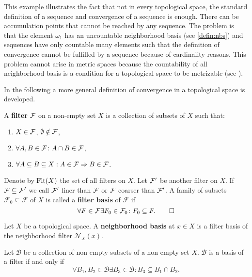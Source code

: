 This example illustrates the fact that not in every topological space, the standard definition of a sequence and convergence of a sequence is enough. There can be accumulation points that cannot be reached by any sequence. The problem is that the element $\omega_1$ has an uncountable neighborhood basis (see \ref{defin:nbs}) and sequences have only countable many elements such that the definition of convergence cannot be fulfilled by a sequence because of cardinality reasons. This problem cannot arise in metric spaces because the countability of all neighborhood basis is a condition for a topological space to be metrizable (see \cite[p. 130f]{MunTop}).

In the following a more general definition of convergence in a topological space is developed.
\begin{defin}
  A \textbf{filter} $\mathcal{F}$ on a non-empty set $X$ is a collection of subsets of $X$ such that:
  \begin{enumerate}
    \item $X \in \mathcal{F}$, $\emptyset \notin \mathcal{F}$,
    \item $\forall A, B \in \mathcal{F}\colon A\cap B \in \mathcal{F}$,
    \item $\forall A \subseteq B \subseteq X: A \in \mathcal{F} \Rightarrow B \in \mathcal{F}$.
  \end{enumerate}
  Denote by ${\rm Flt}(X)$ the set of all filters on $X$.
  Let $\mathcal{F}'$ be another filter on $X$. If $\mathcal{F} \subseteq \mathcal{F}'$ we call $\mathcal{F}'$ finer than $\mathcal{F}$ or $\mathcal{F}$ coarser than $\mathcal{F}'$. A family of subsets $\mathcal{F}_0 \subseteq \mathcal{F}$ of $X$ is called a \textbf{filter basis} of $\mathcal{F}$ if
  \begin{equation*}
    \forall F \in \mathcal{F} \exists F_0 \in \mathcal{F}_0\colon F_0 \subseteq F. \qedhere
  \end{equation*}
\end{defin}

\begin{defin}\label{defin:nbs}
  Let $X$ be a topological space. A \textbf{neighborhood basis} at $x \in X$ is a filter basis of the neighborhood filter $\mathcal{N}_X(x)$.
\end{defin}
  
\begin{lemma}\label{lem:filbas}
  Let $\mathcal{B}$ be a collection of non-empty subsets of a non-empty set $X$. $\mathcal{B}$ is a basis of a filter if and only if
  \begin{equation}\label{eq:filterbasis}
    \forall B_1, B_2 \in \mathcal{B}\exists B_3 \in \mathcal{B}: B_3 \subseteq B_1 \cap B_2.
  \end{equation}
\end{lemma}

